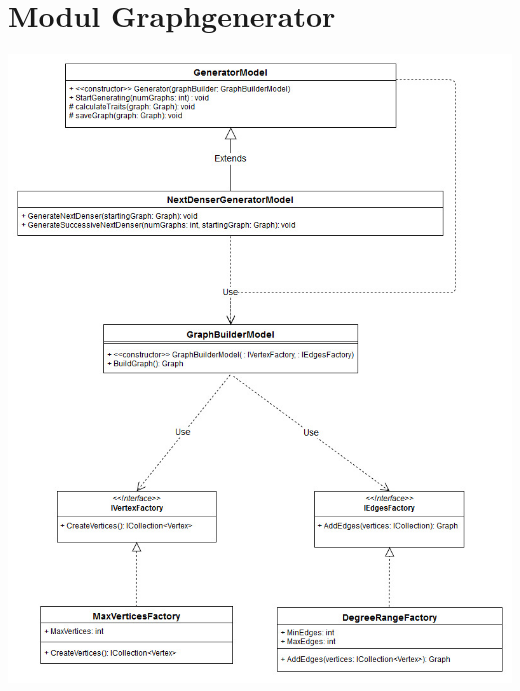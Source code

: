 \documentclass[13pt]{scrreprt}
\begin{document}
	
	\section{Modul Graphgenerator}
	
	\includegraphics[scale=0.5,center]{GeneratorModule.jpg}
	
\end{document}
